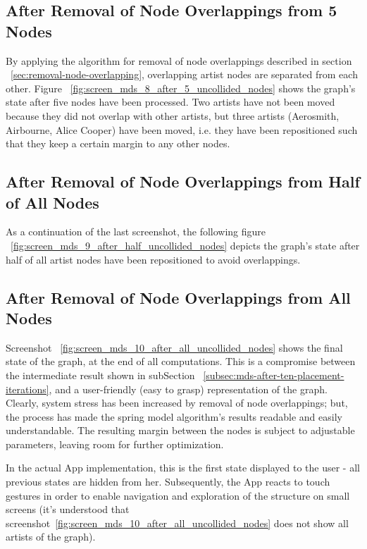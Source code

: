 \subsection{After Removal of Node Overlappings from 5 Nodes}

By applying the algorithm for removal of node overlappings described in section ~\ref{sec:removal-node-overlapping}, overlapping artist nodes are separated from each other. Figure ~\ref{fig:screen_mds_8_after_5_uncollided_nodes} shows the graph's state after five nodes have been processed. Two artists have not been moved because they did not overlap with other artists, but three artists (Aerosmith, Airbourne, Alice Cooper) have been moved, i.e. they have been repositioned such that they keep a certain margin to any other nodes.

\subsection{After Removal of Node Overlappings from Half of All Nodes}

As a continuation of the last screenshot, the following figure ~\ref{fig:screen_mds_9_after_half_uncollided_nodes} depicts the graph's state after half of all artist nodes have been repositioned to avoid overlappings.

\subsection{After Removal of Node Overlappings from All Nodes}

Screenshot ~\ref{fig:screen_mds_10_after_all_uncollided_nodes} shows the final state of the graph, at the end of all computations. This is a compromise between the intermediate result shown in subSection ~\ref{subsec:mds-after-ten-placement-iterations}, and a user-friendly (easy to grasp) representation of the graph. Clearly, system stress has been increased by removal of node overlappings; but, the process has made the spring model algorithm's results readable and easily understandable. The resulting margin between the nodes is subject to adjustable parameters, leaving room for further optimization.

In the actual App implementation, this is the first state displayed to the user - all previous states are hidden from her. Subsequently, the App reacts to touch gestures in order to enable navigation and exploration of the structure on small screens (it's understood that screenshot~\ref{fig:screen_mds_10_after_all_uncollided_nodes} does not show all artists of the graph).


